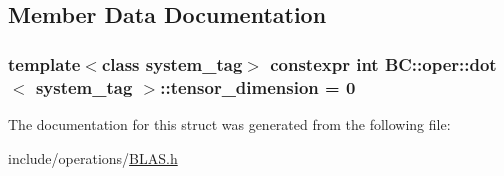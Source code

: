\subsection{Member Data Documentation}
\subsubsection[{\texorpdfstring{tensor\+\_\+dimension}{tensor_dimension}}]{\setlength{\rightskip}{0pt plus 5cm}template$<$class system\+\_\+tag$>$ constexpr int {\bf B\+C\+::oper\+::dot}$<$ system\+\_\+tag $>$\+::tensor\+\_\+dimension = 0\hspace{0.3cm}{\ttfamily [static]}}\hypertarget{structBC_1_1oper_1_1dot_a49c9907dcd4361b52672765f1369762f}{}\label{structBC_1_1oper_1_1dot_a49c9907dcd4361b52672765f1369762f}


The documentation for this struct was generated from the following file\+:\begin{DoxyCompactItemize}
\item 
include/operations/\hyperlink{operations_2BLAS_8h}{B\+L\+A\+S.\+h}\end{DoxyCompactItemize}

